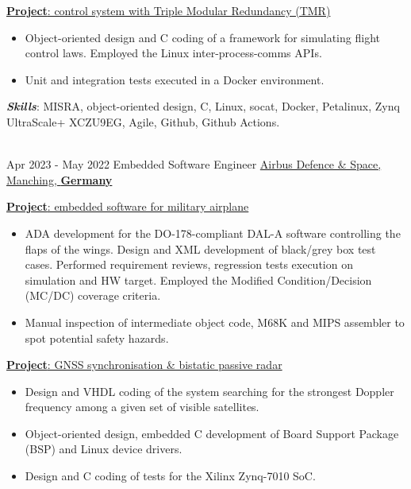 \documentclass[letterpaper]{twentysecondcv} %
\begin{document}
\begin{twenty}
{            \vspace{2 mm}
            \underline{\textbf{Project}: control system with Triple Modular Redundancy (TMR)}

            \vspace{2 mm}
            \begin{itemize}
                \item Object-oriented design and C coding of a framework for simulating flight control laws. Employed the Linux inter-process-comms APIs.
                \item Unit and integration tests executed in a Docker environment.
            \end{itemize}

            \vspace{2 mm}
            \textbf{\textit{Skills}}: MISRA, object-oriented design, C, Linux, socat, Docker, Petalinux, Zynq UltraScale+ XCZU9EG, Agile, Github, Github Actions.
        }\\
    \twentyitem
        {Apr 2023 -}
        {May 2022}
        {Embedded Software Engineer}
        {\href{https://www.airbus.com/en/who-we-are}{Airbus Defence \& Space, Manching, \textbf{Germany}}}
        {}
        {
            \vspace{2 mm}
            \underline{\textbf{Project}: embedded software for military airplane}

            \vspace{2 mm}
            \begin{itemize}
                \item ADA development for the DO-178-compliant DAL-A software controlling the flaps of the wings. Design and XML development of black/grey box test cases. Performed requirement reviews, regression tests execution on simulation and HW target. Employed the Modified Condition/Decision (MC/DC) coverage criteria.
                \item Manual inspection of intermediate object code, M68K and MIPS assembler to spot potential safety hazards.
            \end{itemize}

            \vspace{2 mm}
            \underline{\textbf{Project}: GNSS synchronisation \& bistatic passive radar}

            \vspace{2 mm}
            \begin{itemize}
                \item Design and VHDL coding of the system searching for the strongest Doppler frequency among a given set of visible satellites.
                \item Object-oriented design, embedded C development of Board Support Package (BSP) and Linux device drivers.
                \item Design and C coding of tests for the Xilinx Zynq-7010 SoC.
            \end{itemize}

}
\end{twenty}
\end{document}

